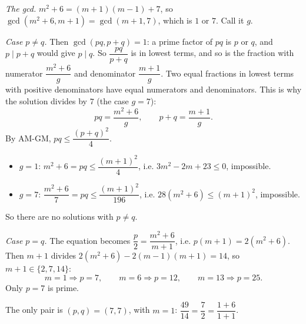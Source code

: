 \emph{The gcd.} $m^2+6=(m+1)(m-1)+7$, so $\gcd\left(m^2+6,m+1\right)=\gcd(m+1,7)$, which is $1$ or $7$. Call it $g$.

\emph{Case $p\ne q$.} Then $\gcd(pq,p+q)=1$: a prime factor of $pq$ is $p$ or $q$, and $p\mid p+q$ would give $p\mid q$. So $\dfrac{pq}{p+q}$ is in lowest terms, and so is the fraction with numerator $\dfrac{m^2+6}{g}$ and denominator $\dfrac{m+1}{g}$. Two equal fractions in lowest terms with positive denominators have equal numerators and denominators. This is why the solution divides by $7$ (the case $g=7$):
\[pq=\dfrac{m^2+6}{g},\qquad p+q=\dfrac{m+1}{g}.\]
By AM-GM, $pq\le\dfrac{(p+q)^2}{4}$.
\begin{itemize}
\item $g=1$: $m^2+6=pq\le\dfrac{(m+1)^2}{4}$, i.e. $3m^2-2m+23\le0$, impossible.
\item $g=7$: $\dfrac{m^2+6}{7}=pq\le\dfrac{(m+1)^2}{196}$, i.e. $28\left(m^2+6\right)\le(m+1)^2$, impossible.
\end{itemize}
So there are no solutions with $p\ne q$.

\emph{Case $p=q$.} The equation becomes $\dfrac p2=\dfrac{m^2+6}{m+1}$, i.e. $p(m+1)=2\left(m^2+6\right)$. Then $m+1$ divides $2\left(m^2+6\right)-2(m-1)(m+1)=14$, so $m+1\in\{2,7,14\}$:
\[m=1\Rightarrow p=7,\qquad m=6\Rightarrow p=12,\qquad m=13\Rightarrow p=25.\]
Only $p=7$ is prime.

The only pair is $\boxed{(p,q)=(7,7)}$, with $m=1$: $\dfrac{49}{14}=\dfrac72=\dfrac{1+6}{1+1}$.
